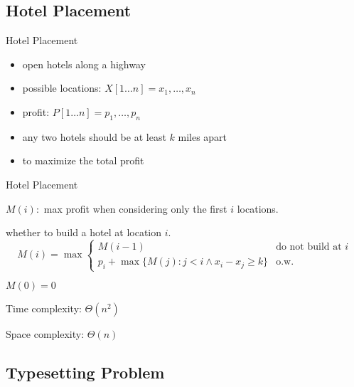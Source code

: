 \documentclass{beamer}
\begin{document}
\subsection{Hotel Placement}

\begin{frame}{Hotel Placement}
  \begin{problem}
    \begin{itemize}
      \item open hotels along a highway
      \item possible locations: $X[1 \ldots n] = x_1, \ldots, x_n$
      \item profit: $P[1 \ldots n] = p_1, \ldots, p_n$
      \item any two hotels should be at least $k$ miles apart
      \item {} to maximize the total profit
    \end{itemize}
  \end{problem}
\end{frame}
\begin{frame}{Hotel Placement}
  \begin{mdframed}
    $M(i):$ max profit when considering only the first $i$ locations.
  \end{mdframed}
  
  \vspace{0.50cm}
  \begin{theorem}[Recurrence]
     whether to build a hotel at location $i$.
    \begin{displaymath}
      M(i) = \max \left\{
        \begin{array}{ll}
          M(i-1) & \textrm{do not build at } i  \\
          p_i + \max \{ M(j): j < i \land x_i - x_j \ge k \} & \textrm{o.w.}
        \end{array}
      \right.
    \end{displaymath}
    
     $M(0) = 0$

    \vspace{0.30cm}
    Time complexity: $\Theta(n^2)$
    
    Space complexity: $\Theta(n)$
  \end{theorem}
\end{frame}
\subsection{Typesetting Problem}
\end{document}

